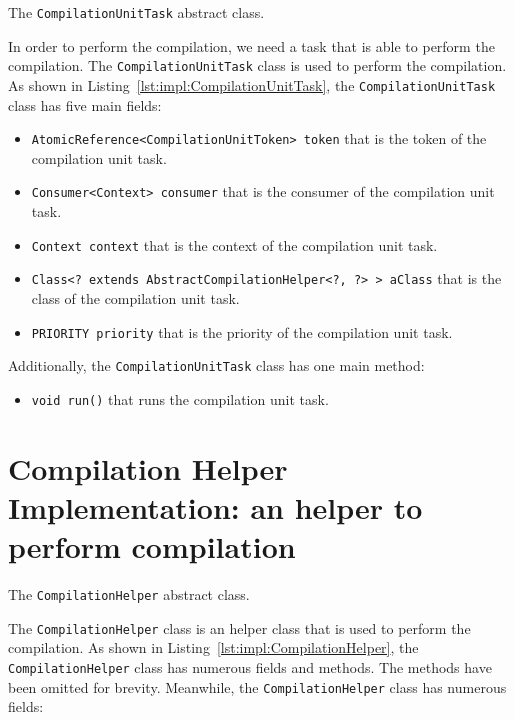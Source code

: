 \begin{Listing}[tbh]
    \centering
    \caption{The \texttt{CompilationUnitTask} abstract class.}
    \label{lst:impl:CompilationUnitTask}
\end{Listing}

In order to perform the compilation, we need a task that is able to perform the compilation. The \texttt{CompilationUnitTask} class is used to perform the compilation. As shown in Listing~\ref{lst:impl:CompilationUnitTask}, the \texttt{CompilationUnitTask} class has five main fields:
\begin{itemize}
    \item \texttt{AtomicReference<CompilationUnitToken> token} that is the token of the compilation unit task.
    \item \texttt{Consumer<Context> consumer} that is the consumer of the compilation unit task.
    \item \texttt{Context context} that is the context of the compilation unit task.
    \item \texttt{Class<? extends AbstractCompilationHelper<?, ?> > aClass} that is the class of the compilation unit task.
    \item \texttt{PRIORITY priority} that is the priority of the compilation unit task.
\end{itemize}

Additionally, the \texttt{CompilationUnitTask} class has one main method:
\begin{itemize}
    \item \texttt{void run()} that runs the compilation unit task.
\end{itemize}

\section{Compilation Helper Implementation: an helper to perform compilation}\label{subsec:impl:CompilationHelper}


\begin{Listing}[tbh]
    \centering
    \caption{The \texttt{CompilationHelper} abstract class.}
    \label{lst:impl:CompilationHelper}
\end{Listing}

The \texttt{CompilationHelper} class is an helper class that is used to perform the compilation. As shown in Listing~\ref{lst:impl:CompilationHelper}, the \texttt{CompilationHelper} class has numerous fields and methods. The methods have been omitted for brevity. Meanwhile, the \texttt{CompilationHelper} class has numerous fields:

